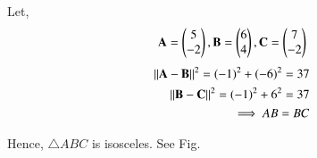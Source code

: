 Let,
\begin{align}
\mathbf{A}=\begin{pmatrix}5 \\ -2\end{pmatrix}, \mathbf{B}=\begin{pmatrix}6 \\ 4\end{pmatrix}, \mathbf{C}=\begin{pmatrix}7 \\ -2 \end{pmatrix}\label{aug/2/5/eq:2.5.2}
\end{align}
\begin{align}
 \left\lVert\mathbf{A-B}\right\rVert^{2} = (-1)^{2}+(-6)^{2} = 37 \label{aug/2/5/eq:2.5.8}\\
 \left\lVert\mathbf{B-C}\right\rVert^{2} = (-1)^{2}+6^{2} = 37 \label{aug/2/5/eq:2.5.10}\\
\implies AB = BC
\end{align}
 
Hence, $\triangle ABC$ is isosceles.
 See Fig. 

